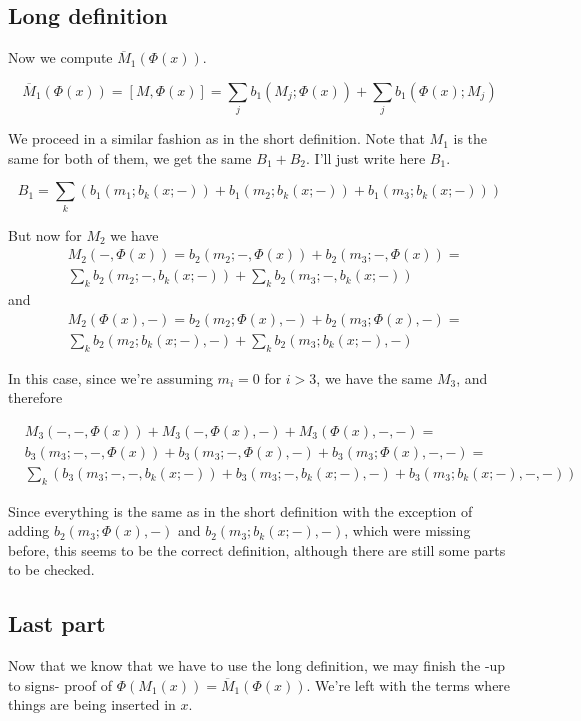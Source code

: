 \documentclass[twoside]{article}
\begin{document}
\subsection{Long definition}

Now we compute $\overline{M}_1(\Phi(x))$.

$$\overline{M}_1(\Phi(x))=[M,\Phi(x)]=\sum_j b_1(M_j;\Phi(x))+\sum_j b_1(\Phi(x);M_j)$$

We proceed in a similar fashion as in the short definition. Note that $M_1$ is the same for both of them, we get the same $B_1+B_2$. I'll just write here $B_1$.

$$B_1=\sum_k(b_1(m_1;b_k(x;-))+b_1(m_2;b_k(x;-))+b_1(m_3;b_k(x;-)))$$

But now for $M_2$ we have 
\begin{align*}
&M_2(-,\Phi(x))=b_2(m_2;-,\Phi(x))+b_2(m_3;-,\Phi(x))=\\
&\sum_k b_2(m_2; -,b_k(x;-))+\sum_k b_2(m_3;-,b_k(x;-))
\end{align*}
and
\begin{align*}
&M_2(\Phi(x),-)=b_2(m_2;\Phi(x),-)+b_2(m_3;\Phi(x),-)=\\
&\sum_k b_2(m_2;b_k(x;-),-)+\sum_k b_2(m_3;b_k(x;-),-)
\end{align*}

In this case, since we're assuming $m_i=0$ for $i>3$, we have the same $M_3$, and therefore 

\begin{align*}
&M_3(-,-,\Phi(x))+M_3(-,\Phi(x),-)+M_3(\Phi(x),-,-)=\\
&b_3(m_3;-,-,\Phi(x))+b_3(m_3;-,\Phi(x),-)+b_3(m_3;\Phi(x),-,-)=\\
&\sum_k (b_3(m_3; -,-,b_k(x;-))+ b_3(m_3;-,b_k(x;-),-)+b_3(m_3;b_k(x;-),-,-))
\end{align*}

Since everything is the same as in the short definition with the exception of adding $b_2(m_3;\Phi(x),-)$ and $b_2(m_3;b_k(x;-),-)$, which were missing before, this seems to be the correct definition, although there are still some parts to be checked.

\subsection{Last part}
Now that we know that we have to use the long definition, we may finish the -up to signs- proof of $\Phi(M_1(x))=\overline{M}_1(\Phi(x))$. We're left with the terms where things are being inserted in $x$. 
\end{document}
